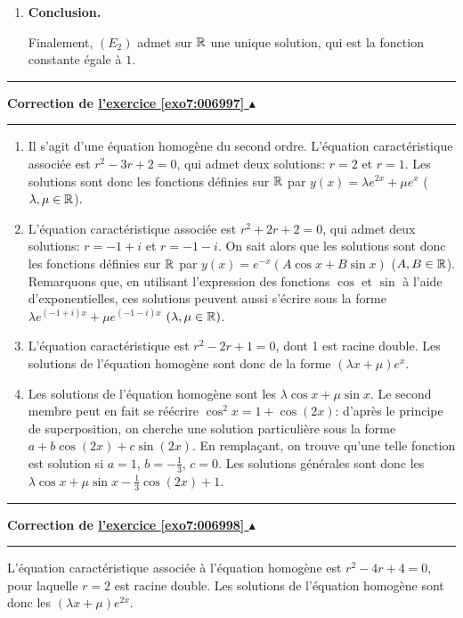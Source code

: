 \documentclass[11pt,a4paper]{article}
\newcounter{exo}
\newcommand{\correction}[1]{\hypertarget{cor7:#1}{}\label{cor7:#1}{\bf Correction de \hyperlink{exo7:#1}{l'exercice \ref{exo7:#1} $\blacktriangle$}}\vspace{1mm}\hrule\vspace{1mm}}
\newcommand{\fincorrection}{\vspace{1mm}\hrule\vspace*{7mm}}
\begin{document}
\begin{enumerate}
\begin{enumerate}
Une solution $y$ de $(E_2)$ sur $\R$ doit \^etre solution sur $]-\infty;0[$ et $]0;+\infty[$, 
il existe donc $\lambda_+,\ \lambda_-\in\R$ tels que 
$$y(x)=\left\lbrace\begin{array}{l}
1+\frac{\lambda_+}{x}\quad \text{si}\ x>0\\
1+\frac{\lambda_-}{x}\quad \text{si}\ x<0
\end{array}\right.$$
Il reste à voir si l'on peut recoller les deux expressions pour obtenir 
une solution sur $\R$. On voit tout de suite que $y$ a une limite (finie) 
en $0$ si et seulement si . 
Dans ce cas, on peut alors poser  et $y$ est la fonction constante 
égale à 1, qui est bien s\^ur dérivable sur $\R$. De plus, $(E_2)$ est bien satisfaite au point $x=0$.

  \item \textbf{Conclusion.}
  
Finalement, $(E_2)$ admet sur $\R$ une unique solution, qui est la fonction constante égale à $1$.
  \end{enumerate}
\end{enumerate}
\fincorrection
\correction{006997}
\begin{enumerate}
\item Il s'agit d'une équation homogène du second ordre. L'équation caractéristique associée est $r^2-3r+2=0$, qui admet deux solutions: $r=2$ et $r=1$. Les solutions sont donc les fonctions définies sur $\R$ par $y(x)=\lambda e^{2x}+\mu e^x$ ($\lambda,\mu\in\mathbb{R}$).
\item L'équation caractéristique associée est $r^2+2r+2=0$, qui admet deux solutions: $r=-1+i$ et $r=-1-i$. On sait alors que les solutions sont donc les fonctions définies sur $\R$ par $y(x)=e^{-x}(A\cos x+ B\sin x)$ ($A, B\in\mathbb{R}$). Remarquons que, en utilisant l'expression des fonctions $\cos$ et $\sin$ à l'aide d'exponentielles, ces solutions peuvent aussi s'écrire sous la forme $\lambda e^{(-1+i)x}+\mu e^{(-1-i)x}$ $(\lambda,\mu\in\mathbb{R})$.
\item L'équation caractéristique est $r^2-2r+1=0$, dont 1 est racine double. 
Les solutions de l'équation homogène sont donc de la forme $(\lambda x+\mu)e^x$. 
\item Les solutions de l'équation homogène sont les $\lambda\cos x+\mu \sin x$. 
Le second membre peut en fait se réécrire $\cos^2 x=1+\cos(2x)$: 
d'après le principe de superposition, on cherche une solution particulière sous 
la forme $a+b\cos(2x)+c\sin(2x)$. En remplaçant, on trouve qu'une telle fonction est solution si $a=1$, $b=-\frac{1}{3}$, $c=0$. Les solutions générales sont donc les $\lambda\cos x+\mu \sin x-\frac{1}{3}\cos(2x)+1$.
\end{enumerate}
\fincorrection
\correction{006998}
L'équation caractéristique associée à l'équation homogène est $r^2-4r+4=0$, 
pour laquelle $r=2$ est racine double. Les solutions de l'équation homogène 
sont donc les $(\lambda x+\mu)e^{2x}$. 
\end{document}

